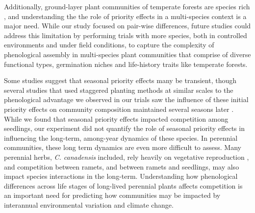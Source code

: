 \documentclass{article}[11pt]
\begin{document}
Additionally, ground-layer plant communities of temperate forests are species rich \citep{Whigham:2004wy}, and understanding the the role of priority effects in a multi-species context is a major need. While our study focused on pair-wise differences, future studies could address this limitation by performing trials with more species, both in controlled environments and under field conditions, to capture the complexity of phenological assembly in multi-species plant communities that comprise of diverse functional types, germination niches and life-history traits like temperate forests.

Some studies suggest that seasonal priority effects many be transient, though several studies that used staggered planting methods at similar scales to the phenological advantage we observed in our trials saw the influence of these initial priority effects on community composition maintained several seasons later \citep{Vaughn:2015wp,Young:2017aa,Torrez:2017to}. While we found that seasonal priority effects impacted competition among seedlings, our experiment did not quantify the role of seasonal priority effects in influencing the long-term, among-year dynamics of these species. %
 In perennial communities, these long term dynamics are even more difficult to assess. Many perennial herbs, \textit{C. canadensis} included, rely heavily on vegetative reproduction \citep{Hawkins:2005ve}, and competition between ramets, and between ramets and seedlings, may also impact species interactions in the long-term. %
Understanding how phenological differences across life stages of long-lived perennial plants affects competition is an important need for predicting how communities may be impacted by interannual environmental variation and climate change.  
\end{document}
